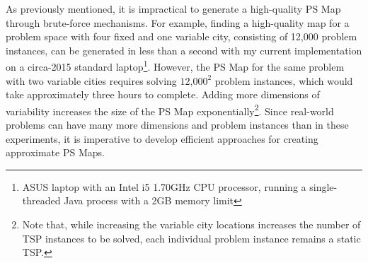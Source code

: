 As previously mentioned, it is impractical to generate a high-quality PS Map through brute-force mechanisms.  For example, finding a high-quality map for a problem space with four fixed and one variable city, consisting of 12,000 problem instances, can be generated in less than a second with my current implementation on a circa-2015 standard laptop\footnote{ASUS laptop with an Intel i5 1.70GHz CPU processor, running a single-threaded Java process with a 2GB memory limit}.  However, the PS Map for the same problem with two variable cities requires solving $\textrm{12,000}^{\textrm{2}}$ problem instances, which would take approximately three hours to complete.    Adding more dimensions of variability increases the size of the PS Map exponentially\footnote{Note that, while increasing the variable city locations increases the number of TSP instances to be solved, each individual problem instance remains a static TSP.}.  Since real-world problems can have many more dimensions and problem instances than in these experiments, it is imperative to develop efficient approaches for creating approximate PS Maps.



